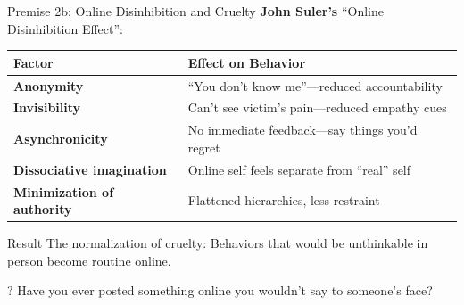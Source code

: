\documentclass[aspectratio=169]{beamer}
\begin{document}
\begin{frame}{Premise 2b: Online Disinhibition and Cruelty}
\textbf{John Suler's} ``Online Disinhibition Effect'':

\begin{table}[h]
\centering
\small
\begin{tabular}{>{\bfseries}l p{7cm}}
\toprule
Factor & Effect on Behavior \\
\midrule
Anonymity & ``You don't know me''---reduced accountability \\
Invisibility & Can't see victim's pain---reduced empathy cues \\
Asynchronicity & No immediate feedback---say things you'd regret \\
Dissociative imagination & Online self feels separate from ``real'' self \\
Minimization of authority & Flattened hierarchies, less restraint \\
\bottomrule
\end{tabular}
\end{table}

\vspace{0.2cm}
\begin{alertblock}{Result}
The normalization of cruelty: Behaviors that would be unthinkable in person become routine online.
\end{alertblock}

\begin{alertblock}{?}
Have you ever posted something online you wouldn't say to someone's face?
\end{alertblock}
\end{frame}
\end{document}
